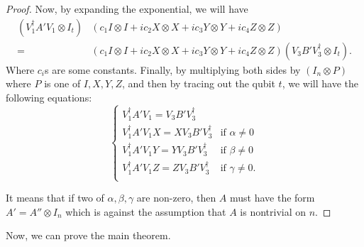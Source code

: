 \begin{proof}
  Now, by expanding the exponential, we will have
  \begin{equation}
    \begin{aligned}
      (V_1^\dagger A' V_1 \otimes I_t) & (c_1 I \otimes I + i c_2 X \otimes X + i c_3 Y \otimes Y + i c_4 Z \otimes Z) \\
      = &(c_1 I \otimes I + i c_2 X \otimes X + i c_3 Y \otimes Y + i c_4 Z \otimes Z) (V_3 B' V_3^\dagger \otimes I_t).  
    \end{aligned}
  \end{equation}
  Where $c_i$s are some constants. Finally, by multiplying both sides by $(I_n \otimes P)$ where $P$ is one of $I, X, Y, Z$, and then by tracing out the qubit $t$, we will have the following equations:
  \begin{equation}
    \begin{cases}
      V_1^\dagger A' V_1 = V_3 B' V_3^\dagger \\
      V_1^\dagger A' V_1 X = X V_3 B' V_3^\dagger & \text{if }\alpha \ne 0 \\
      V_1^\dagger A' V_1 Y = Y V_3 B' V_3^\dagger & \text{if }\beta \ne 0 \\
      V_1^\dagger A' V_1 Z = Z V_3 B' V_3^\dagger & \text{if }\gamma \ne 0. \\
    \end{cases}
  \end{equation}

  It means that if two of $\alpha, \beta, \gamma$ are non-zero, then $A$ must have the form $A' = A'' \otimes I_n$ which is against the assumption that $A$ is nontrivial on $n$.
\end{proof}

Now, we can prove the main theorem.

